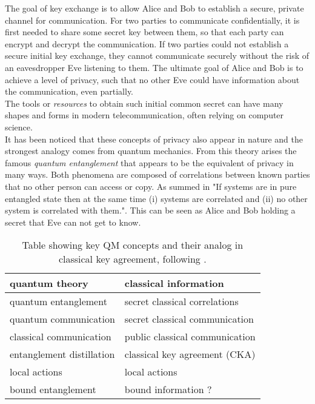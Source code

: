 

The goal of key exchange is to allow Alice and Bob to establish a secure, private channel for communication.
For two parties to communicate confidentially, it is first needed to share some secret key between them, so that each party can encrypt and decrypt the communication.
If two parties could not establish a secure initial key exchange, they cannot communicate securely without the risk of an eavesdropper Eve listening to them.
The ultimate goal of Alice and Bob is to achieve a level of privacy, such that no other Eve could have information about the communication, even partially.\\
The tools or \emph{resources} to obtain such initial common secret can have many shapes and forms in modern telecommunication, often relying on computer science.\\

It has been noticed that these concepts of privacy also appear in nature and the strongest analogy comes from quantum mechanics.\footnotemark 
From this theory arises the famous \emph{quantum entanglement} that appears to be the equivalent of privacy in many ways.
Both phenomena are composed of correlations between known parties that no other person can access or copy. As summed in \cite{4H07} "If systems are in pure entangled state then at the same time (i) systems are correlated and (ii) no other system is correlated with them.". 
This can be seen as Alice and Bob holding a secret that Eve can not get to know.
\begin{table}[h]
	 \centering
	 	\begin{tabular}{ l | l}
	 		\textbf{quantum theory} & \textbf{classical information} \\ 
	 		\hline 
	 		quantum entanglement & secret classical correlations \\ 
	 		quantum communication & secret classical communication \\ 
	 		classical communication & public classical communication \\ 
	 		entanglement distillation & classical key agreement (CKA) \\ 
	 		local actions & local actions \\ 
	 		bound entanglement & bound information ? \\
	 	\end{tabular} 
	 	\caption{Table showing key QM concepts and their analog in classical key agreement, following \cite{CP02}.
	 	\label{Tab:analogy}}
	 \end{table}
\\

